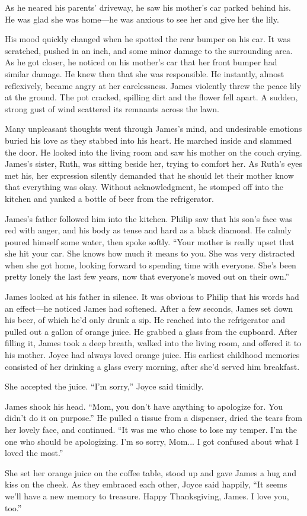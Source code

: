 As he neared his parents' driveway, he saw his mother's car parked behind his. He was glad she was home—he was anxious to see her and give her the lily.

His mood quickly changed when he spotted the rear bumper on his car. It was scratched, pushed in an inch, and some minor damage to the surrounding area. As he got closer, he noticed on his mother's car that her front bumper had similar damage. He knew then that she was responsible. He instantly, almost reflexively, became angry at her carelessness. James violently threw the peace lily at the ground. The pot cracked, spilling dirt and the flower fell apart. A sudden, strong gust of wind scattered its remnants across the lawn.

Many unpleasant thoughts went through James's mind, and undesirable emotions buried his love as they stabbed into his heart. He marched inside and slammed the door. He looked into the living room and saw his mother on the couch crying. James's sister, Ruth, was sitting beside her, trying to comfort her. As Ruth's eyes met his, her expression silently demanded that he should let their mother know that everything was okay. Without acknowledgment, he stomped off into the kitchen and yanked a bottle of beer from the refrigerator.

James's father followed him into the kitchen. Philip saw that his son's face was red with anger, and his body as tense and hard as a black diamond. He calmly poured himself some water, then spoke softly. “Your mother is really upset that she hit your car. She knows how much it means to you. She was very distracted when she got home, looking forward to spending time with everyone. She's been pretty lonely the last few years, now that everyone's moved out on their own.”

James looked at his father in silence. It was obvious to Philip that his words had an effect—he noticed James had softened. After a few seconds, James set down his beer, of which he'd only drunk a sip. He reached into the refrigerator and pulled out a gallon of orange juice. He grabbed a glass from the cupboard. After filling it, James took a deep breath, walked into the living room, and offered it to his mother. Joyce had always loved orange juice. His earliest childhood memories consisted of her drinking a glass every morning, after she'd served him breakfast.

She accepted the juice. “I'm sorry,” Joyce said timidly.

James shook his head. “Mom, you don't have anything to apologize for. You didn't do it on purpose.” He pulled a tissue from a dispenser, dried the tears from her lovely face, and continued. “It was me who chose to lose my temper. I'm the one who should be apologizing. I'm so sorry, Mom... I got confused about what I loved the most.”

She set her orange juice on the coffee table, stood up and gave James a hug and kiss on the cheek. As they embraced each other, Joyce said happily, “It seems we'll have a new memory to treasure. Happy Thanksgiving, James. I love you, too.”
